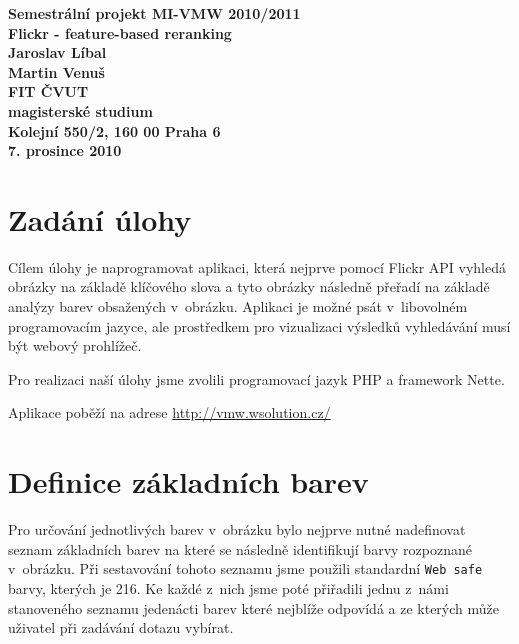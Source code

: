 \documentclass[12pt]{article}
\author{Martin Venuš, Jaroslav Líbal}
\begin{document}

\begin{center}
\bf Semestrální projekt MI-VMW 2010/2011\\[5mm]
    Flickr - feature-based reranking\\[5mm]
       Jaroslav Líbal\\
       Martin Venuš\\[5mm]
FIT ČVUT\\[2mm]
magisterské studium\\[2mm]
Kolejní 550/2, 160 00 Praha 6\\[2mm]
7. prosince 2010
\end{center}

\newpage
\tableofcontents
\newpage

\section{Zadání úlohy}
Cílem úlohy je naprogramovat aplikaci, která nejprve pomocí Flickr API vyhledá obrázky na základě klíčového slova a tyto obrázky následně přeřadí na základě analýzy barev obsažených v~obrázku. Aplikaci je možné psát v~libovolném programovacím jazyce, ale prostředkem pro vizualizaci výsledků vyhledávání musí být webový prohlížeč.

Pro realizaci naší úlohy jsme zvolili programovací jazyk PHP a framework Nette.

Aplikace poběží na adrese \url{http://vmw.wsolution.cz/}


\section{Definice základních barev}
Pro určování jednotlivých barev v~obrázku bylo nejprve nutné nadefinovat seznam základních barev na které se následně identifikují barvy rozpoznané v~obrázku. Při sestavování tohoto seznamu jsme použili standardní \texttt{Web safe} barvy, kterých je 216. Ke každé z~nich jsme poté přiřadili jednu z~námi stanoveného seznamu jedenácti barev které nejblíže odpovídá a ze kterých může uživatel při zadávání dotazu vybírat.
\end{document}
